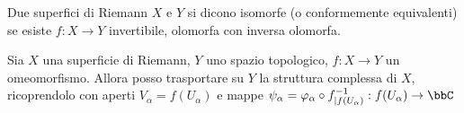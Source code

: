 
\begin{definizione}
Due superfici di Riemann $X$ e $Y$ si dicono isomorfe (o conformemente equivalenti) se esiste $f:X\rightarrow Y$ invertibile, olomorfa con inversa olomorfa.
\end{definizione}


\begin{osservazione}
Sia $X$ una superficie di Riemann, $Y$ uno spazio topologico, $f:X\rightarrow Y$ un omeomorfismo. Allora posso trasportare su $Y$ la struttura complessa di $X$, ricoprendolo con aperti $V_\alpha=f(U_\alpha)$ e mappe $\psi_\alpha=\varphi_\alpha \circ f^{-1}_{|f(U_\alpha)}:f(U_\alpha)\rightarrow\bbC$
\end{osservazione}


